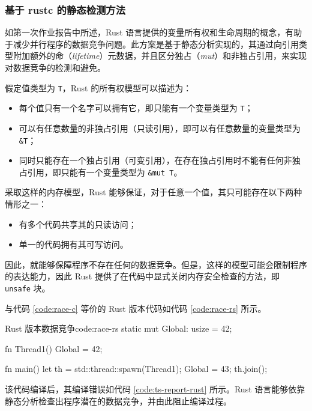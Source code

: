 \documentclass[a4paper, 12pt]{article} %
\newcounter{code}
\numberwithin{equation}{section}
\begin{document}
\subsubsection{基于 rustc 的静态检测方法}

如第一次作业报告中所述，Rust 语言提供的变量所有权和生命周期的概念，有助于减少并行程序的数据竞争问题。此方案是基于静态分析实现的，其通过向引用类型附加额外的命（\textit{lifetime}）元数据，并且区分独占（\textit{mut}）和非独占引用，来实现对数据竞争的检测和避免。

假定值类型为 \lstinline{T}，Rust 的所有权模型可以描述为：

\begin{itemize}
  \item 每个值只有一个名字可以拥有它，即只能有一个变量类型为 \lstinline{T}；
  \item 可以有任意数量的非独占引用（只读引用），即可以有任意数量的变量类型为 \lstinline{&T}；
  \item 同时只能存在一个独占引用（可变引用），在存在独占引用时不能有任何非独占引用，即只能有一个变量类型为 \lstinline{&mut T}。
\end{itemize}

采取这样的内存模型，Rust 能够保证，对于任意一个值，其只可能存在以下两种情形之一：

\begin{itemize}
  \item 有多个代码共享其的只读访问；
  \item 单一的代码拥有其可写访问。
\end{itemize}

因此，就能够保障程序不存在任何的数据竞争。但是，这样的模型可能会限制程序的表达能力，因此 Rust 提供了在代码中显式关闭内存安全检查的方法，即 \lstinline{unsafe} 块。

与代码 \ref{code:race-c} 等价的 Rust 版本代码如代码 \ref{code:race-rs} 所示。

\begin{code}{Rust 版本数据竞争}{code:race-rs}
  static mut Global: usize = 42;

  fn Thread1() {
    Global = 42;
  }
  
  fn main() {
    let th = std::thread::spawn(Thread1);
    Global = 43;
    th.join();
  }  
\end{code}

该代码编译后，其编译错误如代码 \ref{code:ts-report-rust} 所示。Rust 语言能够依靠静态分析检查出程序潜在的数据竞争，并由此阻止编译过程。
\end{document}
